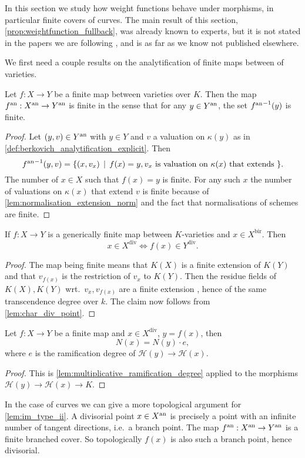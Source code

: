 In this section we study how weight functions behave under morphisms, in particular finite covers of curves. 
The main result of this section, \cref{prop:weightfunction_fullback}, was already known to experts, but it is not stated in the papers we are following \cite{bakerWeightFunctionsBerkovich2016,nicaiseBerkovichSkeletaBirational2016,mustataWeightFunctionsNonArchimedean2015}, and is as far as we know not published elsewhere. 

We first need a couple results on the analytification of finite maps between of varieties. 

\begin{lemma}
	Let $f: X \to Y$ be a finite map between varieties over  $K$. 
Then the map $f{}^{\text{an}}: X{}^{\text{an}} \to Y{}^{\text{an}}$ is finite in the sense that for any $y \in Y{}^{\text{an}}$, the set ${f{}^{\text{an}}}^{-1}(y)$ is finite. 
\end{lemma}
\begin{proof}
	Let $(y, v) \in Y{}^{\text{an}}$ with $y \in Y$ and $v$ a valuation on $\kappa(y)$ as in \cref{def:berkovich_analytification_explicit}. 
	Then \[
		{f\an}^{-1} (y, v) = \{(x, v_x) \st f(x) = y, v_x \text{ is valuation on $\kappa(x)$ that extends }  \} 
	.\]
	The number of $x \in X$ such that $f(x) = y$ is finite. 
	For any such $x$ the number of valuations on $\kappa(x)$ that extend $v$ is finite because of \cref{lem:normalisation_extension_norm} and the fact that normalisations of schemes are finite. 
\end{proof}

\begin{lemma}\label{lem:im_type_ii}
	If $f: X \to Y$ is a generically finite map between $K$-varieties and $x \in X^{\text{bir}}$. Then
	\[
		x \in X^\text{div} \iff f(x) \in Y^\text{div}
	.\] 
\end{lemma}
\begin{proof}
	The map being finite means that $K(X)$ is a finite extension of $K(Y)$ and that $v_{f(x)}$ is the restriction of $v_x$ to $K(Y)$. 
	Then the residue fields of $K(X), K(Y)$ wrt.\ $v_x, v_{f(x)}$ are a finite extension , hence of the same transcendence degree over $k$. 
	The claim now follows from \cref{lem:char_div_point}.
\end{proof}
\begin{lemma}
	Let $f: X \to Y$ be a finite map and $x \in X^{\text{div}}$, $y = f(x)$, 
	then \[
		N(x) = N(y)\cdot e
	,\]
	where $e$ is the ramification degree of $\mathcal{H} (y) \to \mathcal{H} (x)$. 
\end{lemma}
\begin{proof}
	This is \cref{lem:multiplicative_ramification_degree} applied to the morphisms $\mathcal{H} (y) \to \mathcal{H} (x) \to K$.
\end{proof}
\begin{remark}
	In the case of curves we can give a more topological argument for \cref{lem:im_type_ii}. 
	A divisorial point $x \in X{}^{\text{an}}$ is precisely a point with an infinite number of tangent directions, i.e.\ a branch point.
	The map $f{}^{\text{an}}: X{}^{\text{an}} \to Y{}^{\text{an}} $ is a finite branched cover. So topologically $f(x)$ is also such a branch point, hence divisorial. 	
\end{remark}

